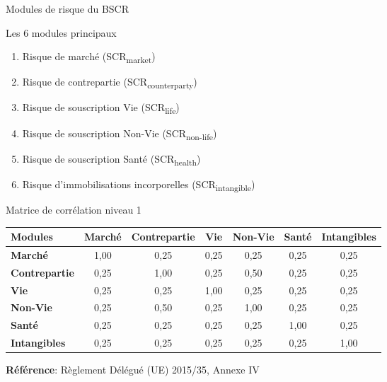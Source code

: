 \documentclass[10pt,aspectratio=169]{beamer}
\begin{document}
\begin{frame}{Modules de risque du BSCR}
\begin{block}{Les 6 modules principaux}
\begin{enumerate}
\item Risque de marché (SCR\textsubscript{market})
\item Risque de contrepartie (SCR\textsubscript{counterparty})
\item Risque de souscription Vie (SCR\textsubscript{life})
\item Risque de souscription Non-Vie (SCR\textsubscript{non-life})
\item Risque de souscription Santé (SCR\textsubscript{health})
\item Risque d'immobilisations incorporelles (SCR\textsubscript{intangible})
\end{enumerate}
\end{block}
\end{frame}

\begin{frame}{Matrice de corrélation niveau 1}
\scriptsize
\begin{table}
\begin{tabular}{l|cccccc}
\textbf{Modules} & \textbf{Marché} & \textbf{Contrepartie} & \textbf{Vie} & \textbf{Non-Vie} & \textbf{Santé} & \textbf{Intangibles} \\
\midrule
\textbf{Marché} & 1,00 & 0,25 & 0,25 & 0,25 & 0,25 & 0,25 \\
\textbf{Contrepartie} & 0,25 & 1,00 & 0,25 & 0,50 & 0,25 & 0,25 \\
\textbf{Vie} & 0,25 & 0,25 & 1,00 & 0,25 & 0,25 & 0,25 \\
\textbf{Non-Vie} & 0,25 & 0,50 & 0,25 & 1,00 & 0,25 & 0,25 \\
\textbf{Santé} & 0,25 & 0,25 & 0,25 & 0,25 & 1,00 & 0,25 \\
\textbf{Intangibles} & 0,25 & 0,25 & 0,25 & 0,25 & 0,25 & 1,00 \\
\end{tabular}
\end{table}
\normalsize
\textbf{Référence}: Règlement Délégué (UE) 2015/35, Annexe IV
\end{frame}
\end{document}
